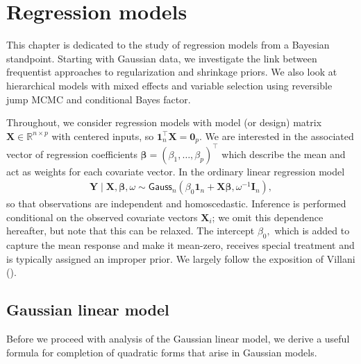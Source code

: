 \documentclass[
  11pt,
  letterpaper,
]{scrbook}
\theoremstyle{definition}
\theoremstyle{plain}
\theoremstyle{plain}
\theoremstyle{plain}
\theoremstyle{definition}
\theoremstyle{definition}
\theoremstyle{plain}
\theoremstyle{plain}
\theoremstyle{remark}
\begin{document}

\chapter{Regression models}\label{regression-models}

This chapter is dedicated to the study of regression models from a
Bayesian standpoint. Starting with Gaussian data, we investigate the
link between frequentist approaches to regularization and shrinkage
priors. We also look at hierarchical models with mixed effects and
variable selection using reversible jump MCMC and conditional Bayes
factor.

Throughout, we consider regression models with model (or design) matrix
\(\mathbf{X} \in \mathbb{R}^{n \times p}\) with centered inputs, so
\(\mathbf{1}_n^\top\mathbf{X}=\mathbf{0}_p.\) We are interested in the
associated vector of regression coefficients
\(\boldsymbol{\beta} = (\beta_1, \ldots, \beta_p)^\top\) which describe
the mean and act as weights for each covariate vector. In the ordinary
linear regression model \begin{align*}
\boldsymbol{Y} \mid \mathbf{X}, \boldsymbol{\beta}, \omega \sim \mathsf{Gauss}_n(\beta_0\mathbf{1}_n + \mathbf{X}\boldsymbol{\beta}, \omega^{-1}\mathbf{I}_n),
\end{align*} so that observations are independent and homoscedastic.
Inference is performed conditional on the observed covariate vectors
\(\mathbf{X}_i\); we omit this dependence hereafter, but note that this
can be relaxed. The intercept \(\beta_0,\) which is added to capture the
mean response and make it mean-zero, receives special treatment and is
typically assigned an improper prior. We largely follow the exposition
of Villani ().

\section{Gaussian linear model}\label{gaussian-linear-model}

Before we proceed with analysis of the Gaussian linear model, we derive
a useful formula for completion of quadratic forms that arise in
Gaussian models.
\end{document}
